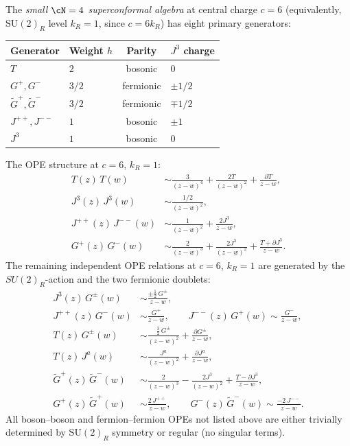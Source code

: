 \begin{definition}[Small \texorpdfstring{$\cN = 4$}{cN = 4} SCA at \texorpdfstring{$c = 6$}{c = 6}]
\label{def:n4-sca-c6}
The \emph{small $\cN = 4$ superconformal algebra} at central
charge $c = 6$ (equivalently, $\mathrm{SU}(2)_R$ level
$k_R = 1$, since $c = 6k_R$) has eight primary generators:
\begin{center}
\small
\renewcommand{\arraystretch}{1.2}
\begin{tabular}{llcl}
\textbf{Generator} & \textbf{Weight $h$} & \textbf{Parity}
 & $J^3$ \textbf{charge} \\
\hline
$T$ & $2$ & bosonic & $0$ \\
$G^+, G^-$ & $3/2$ & fermionic & $\pm 1/2$ \\
$\tilde{G}^+, \tilde{G}^-$ & $3/2$ & fermionic & $\mp 1/2$ \\
$J^{++}, J^{--}$ & $1$ & bosonic & $\pm 1$ \\
$J^3$ & $1$ & bosonic & $0$
\end{tabular}
\end{center}
The OPE structure at $c = 6$, $k_R = 1$:
\begin{align}
T(z)\,T(w) &\sim \frac{3}{(z-w)^4} + \frac{2T}{(z-w)^2}
 + \frac{\partial T}{z-w}, \label{eq:n4-TT} \\
J^3(z)\,J^3(w) &\sim \frac{1/2}{(z-w)^2}, \label{eq:n4-J3J3} \\
J^{++}(z)\,J^{--}(w) &\sim \frac{1}{(z-w)^2}
 + \frac{2J^3}{z-w}, \label{eq:n4-JppJmm} \\
G^+(z)\,G^-(w) &\sim \frac{2}{(z-w)^3} + \frac{2J^3}{(z-w)^2}
 + \frac{T + \partial J^3}{z-w}. \label{eq:n4-GpGm}
\end{align}
The remaining independent OPE relations at $c = 6$, $k_R = 1$ are
generated by the \(SU(2)_R\)-action and the two fermionic doublets:
\begin{align}
J^3(z)\,G^\pm(w) &\sim \frac{\pm\tfrac{1}{2}\,G^\pm}{z-w}, \label{eq:n4-J3Gpm} \\
J^{++}(z)\,G^-(w) &\sim \frac{G^+}{z-w},\qquad
J^{--}(z)\,G^+(w) \sim \frac{G^-}{z-w}, \label{eq:n4-JpmGmp} \\
T(z)\,G^\pm(w) &\sim \frac{\tfrac{3}{2}\,G^\pm}{(z-w)^2}
 + \frac{\partial G^\pm}{z-w}, \label{eq:n4-TG} \\
T(z)\,J^a(w) &\sim \frac{J^a}{(z-w)^2} + \frac{\partial J^a}{z-w},
 \label{eq:n4-TJ} \\
\tilde{G}^+(z)\,\tilde{G}^-(w) &\sim \frac{2}{(z-w)^3}
 - \frac{2J^3}{(z-w)^2}
 + \frac{T - \partial J^3}{z-w}, \label{eq:n4-GtpGtm} \\
G^+(z)\,\tilde{G}^+(w) &\sim \frac{2\,J^{++}}{z-w},\qquad
G^-(z)\,\tilde{G}^-(w) \sim \frac{-2\,J^{--}}{z-w}.
 \label{eq:n4-GGt-cross}
\end{align}
All boson--boson and fermion--fermion OPEs not listed above
are either trivially determined by $\mathrm{SU}(2)_R$ symmetry
or regular \textup{(}no singular terms\textup{)}.
\end{definition}

